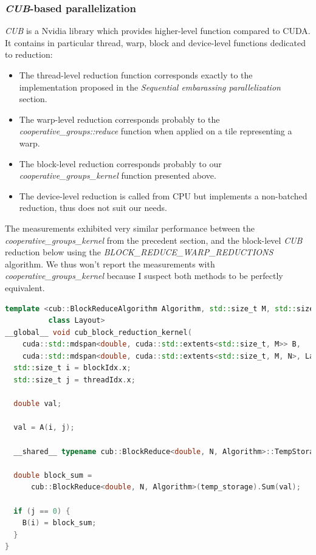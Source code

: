 \documentclass{article}
\begin{document}
\subsubsection{\textit{CUB}-based parallelization}

\textit{CUB} is a Nvidia library which provides higher-level function compared to CUDA. It contains in particular thread, warp, block and device-level functions dedicated to reduction:

\begin{itemize}
	\item The thread-level reduction function corresponds exactly to the implementation proposed in the \textit{Sequential embarassing parallelization} section.
	\item The warp-level reduction corresponds probably to the \textit{cooperative\_groups::reduce} function when applied on a tile representing a warp.
	\item The block-level reduction corresponds probably to our \textit{cooperative\_groups\_kernel} function presented above.
	\item The device-level reduction is called from CPU but implements a non-batched reduction, thus does not suit our needs.
\end{itemize}

The measurements exhibited very similar performance between the \textit{cooperative\_groups\_kernel} from the precedent section, and the block-level \textit{CUB} reduction below using the \textit{BLOCK\_REDUCE\_WARP\_REDUCTIONS} algorithm. We thus won't report the measurements with \textit{cooperative\_groups\_kernel} because I suspect both methods to be perfectly equivalent.

\begin{lstlisting}[language=C++]
template <cub::BlockReduceAlgorithm Algorithm, std::size_t M, std::size_t N,
          class Layout>
__global__ void cub_block_reduction_kernel(
    cuda::std::mdspan<double, cuda::std::extents<std::size_t, M>> B,
    cuda::std::mdspan<double, cuda::std::extents<std::size_t, M, N>, Layout> A) {
  std::size_t i = blockIdx.x;
  std::size_t j = threadIdx.x;

  double val;

  val = A(i, j);

  __shared__ typename cub::BlockReduce<double, N, Algorithm>::TempStorage temp_storage;

  double block_sum =
      cub::BlockReduce<double, N, Algorithm>(temp_storage).Sum(val);

  if (j == 0) {
    B(i) = block_sum;
  }
}
\end{lstlisting}
\end{document}
